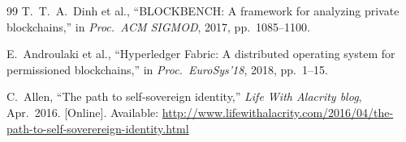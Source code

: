 \documentclass[conference]{IEEEtran}
\begin{document}
\begin{thebibliography}{99}
T.~T.~A.~Dinh et al.,
``BLOCKBENCH: A framework for analyzing private blockchains,''
in \textit{Proc.\ ACM SIGMOD}, 2017, pp.~1085--1100.

E.~Androulaki et al.,
``Hyperledger Fabric: A distributed operating system for permissioned blockchains,''
in \textit{Proc.\ EuroSys'18}, 2018, pp.~1--15.

C.~Allen,
``The path to self-sovereign identity,''
\textit{Life With Alacrity blog}, Apr.~2016.
[Online]. Available: \url{http://www.lifewithalacrity.com/2016/04/the-path-to-self-soverereign-identity.html}

\end{thebibliography}
\end{document}
